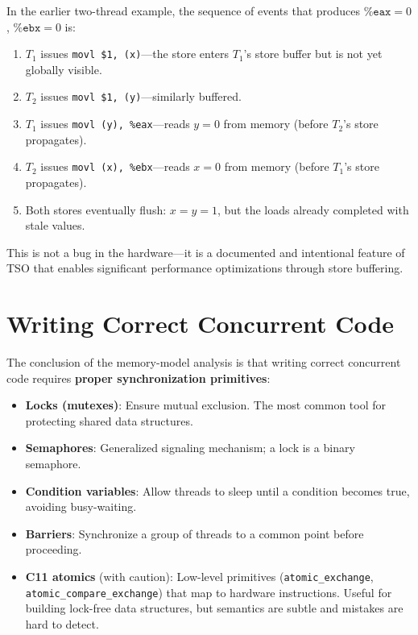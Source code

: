 \documentclass[11pt]{article}
\begin{document}
In the earlier two-thread example, the sequence of events that produces $\%\texttt{eax} = 0$, $\%\texttt{ebx} = 0$ is:

\begin{enumerate}
    \item $T_1$ issues \texttt{movl \$1, (x)}---the store enters $T_1$'s store buffer but is not yet globally visible.
    \item $T_2$ issues \texttt{movl \$1, (y)}---similarly buffered.
    \item $T_1$ issues \texttt{movl (y), \%eax}---reads $y = 0$ from memory (before $T_2$'s store propagates).
    \item $T_2$ issues \texttt{movl (x), \%ebx}---reads $x = 0$ from memory (before $T_1$'s store propagates).
    \item Both stores eventually flush: $x = y = 1$, but the loads already completed with stale values.
\end{enumerate}

This is not a bug in the hardware---it is a documented and intentional feature of TSO that enables significant performance optimizations through store buffering.

\section{Writing Correct Concurrent Code}

The conclusion of the memory-model analysis is that writing correct concurrent code requires \textbf{proper synchronization primitives}:

\begin{itemize}
    \item \textbf{Locks (mutexes)}: Ensure mutual exclusion. The most common tool for protecting shared data structures.
    \item \textbf{Semaphores}: Generalized signaling mechanism; a lock is a binary semaphore.
    \item \textbf{Condition variables}: Allow threads to sleep until a condition becomes true, avoiding busy-waiting.
    \item \textbf{Barriers}: Synchronize a group of threads to a common point before proceeding.
    \item \textbf{C11 atomics} (with caution): Low-level primitives (\texttt{atomic\_exchange}, \texttt{atomic\_compare\_exchange}) that map to hardware instructions. Useful for building lock-free data structures, but semantics are subtle and mistakes are hard to detect.
\end{itemize}
\end{document}
